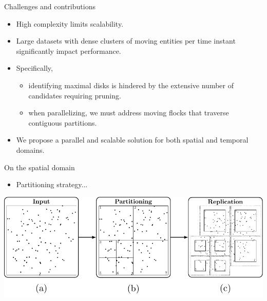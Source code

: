 \begin{frame}{Challenges and contributions}
    \begin{itemize}
        \item High complexity limits scalability.
        \item Large datasets with dense clusters of moving entities per time instant significantly impact performance.
        \item Specifically,
        \begin{itemize}
            \item identifying maximal disks is hindered by the extensive number of candidates requiring pruning.
            \item when parallelizing, we must address moving flocks that traverse contiguous partitions.
        \end{itemize}
        \item We propose a parallel and scalable solution for both spatial and temporal domains.
    \end{itemize}
\end{frame}

\begin{frame}{On the spatial domain}
    \begin{itemize} \item Partitioning strategy... \end{itemize} \vspace{0.5cm}

        \centering
        \includegraphics[trim={0 25 0 0}, clip, width=\textwidth]{../thesis/chapterPFlocks/figures/PartReplication/P123}
    \end{frame}

